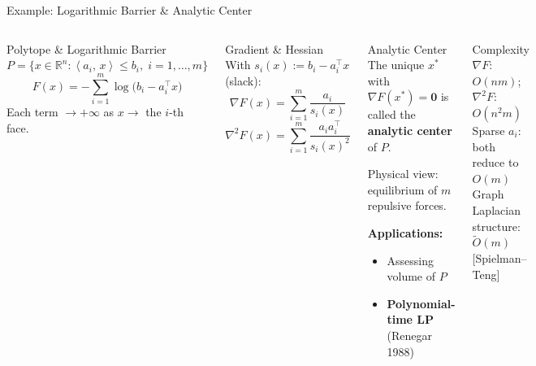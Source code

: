 \documentclass[aspectratio=169,10pt]{beamer}
\newcommand{\R}{\mathbb{R}}
\newcommand{\Hess}{\nabla^2}
\newcommand{\grad}{\nabla}
\newcommand{\ip}[2]{\left\langle #1,\, #2 \right\rangle}
\begin{document}
\begin{frame}{Example: Logarithmic Barrier \& Analytic Center}
  \begin{columns}[T]
      \begin{block}{Polytope \& Logarithmic Barrier}
        $P = \{x\in\R^n : \ip{a_i}{x}\le b_i,\; i=1,\ldots,m\}$
        \[
          F(x) = -\sum_{i=1}^{m}\log\bigl(b_i - a_i^\top x\bigr)
        \]
        Each term $\to+\infty$ as $x\to$ the $i$-th face.
      \end{block}
      \vspace{0.3em}
      \begin{block}{Gradient \& Hessian}
        With $s_i(x):=b_i-a_i^\top x$ (slack):
        \[
          \grad F(x) = \sum_{i=1}^{m}\frac{a_i}{s_i(x)}
        \]
        \[
          \Hess F(x) = \sum_{i=1}^{m}\frac{a_ia_i^\top}{s_i(x)^2}
        \]
      \end{block}

      \begin{exampleblock}{Analytic Center}
        The unique $x^*$ with $\grad F(x^*)=\mathbf{0}$ is called the
        \textbf{analytic center} of $P$.

        \vspace{0.2em}
        Physical view: equilibrium of $m$ repulsive forces.

        \vspace{0.2em}
        \textbf{Applications:}
        \begin{itemize}
          \item Assessing volume of $P$
          \item \textbf{Polynomial-time LP} (Renegar 1988)
        \end{itemize}
      \end{exampleblock}
      \vspace{0.3em}
      \begin{alertblock}{Complexity}
        $\grad F$: $O(nm)$;\quad $\Hess F$: $O(n^2 m)$\\
        Sparse $a_i$: both reduce to $O(m)$\\
        Graph Laplacian structure: $\tilde{O}(m)$ [Spielman--Teng]
      \end{alertblock}
  \end{columns}
\end{frame}

\end{document}
